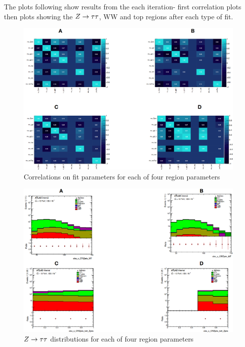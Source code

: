 The plots following show results from the each iteration- first correlation plots then plots showing the $Z\rightarrow\tau\tau$, WW and top regions after each type of fit.
\begin{figure}[!htbp]
\centering
\includegraphics[width=.9\linewidth]{Pictures/ZttBDT/correlations.png}
\caption{Correlations on fit parameters for each of four region parameters}
\label{fig:ZjetsBDTcorrelation}
\end{figure} 

\begin{figure}[!htbp]
\centering
\includegraphics[width=.9\linewidth]{Pictures/ZttBDT/ZttCR.png}
\caption{$Z\rightarrow\tau\tau$ distributions for each of four region parameters}
\label{fig:ZjetsBDTZttCR}
\end{figure} 

